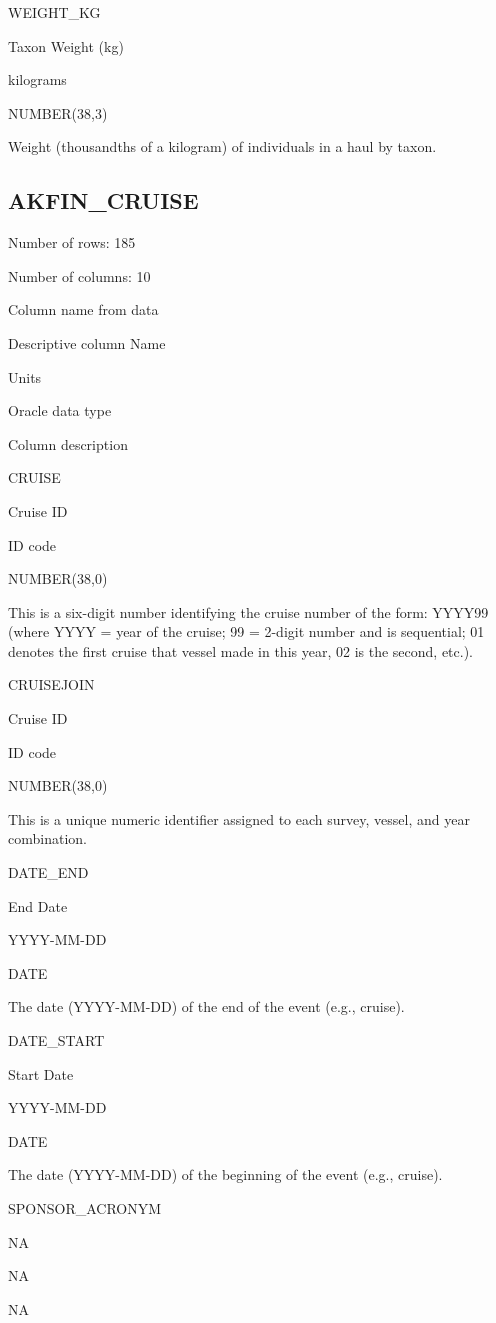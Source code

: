 \documentclass[
  letterpaper,
  oneside,
  open=any]{scrbook}
\begin{document}
WEIGHT\_KG

Taxon Weight (kg)

kilograms

NUMBER(38,3)

Weight (thousandths of a kilogram) of individuals in a haul by taxon.

\hypertarget{akfin_cruise}{%
\subsection{AKFIN\_CRUISE}\label{akfin_cruise}}

Number of rows: 185

Number of columns: 10

Column name from data

Descriptive column Name

Units

Oracle data type

Column description

CRUISE

Cruise ID

ID code

NUMBER(38,0)

This is a six-digit number identifying the cruise number of the form:
YYYY99 (where YYYY = year of the cruise; 99 = 2-digit number and is
sequential; 01 denotes the first cruise that vessel made in this year,
02 is the second, etc.).

CRUISEJOIN

Cruise ID

ID code

NUMBER(38,0)

This is a unique numeric identifier assigned to each survey, vessel, and
year combination.

DATE\_END

End Date

YYYY-MM-DD

DATE

The date (YYYY-MM-DD) of the end of the event (e.g., cruise).

DATE\_START

Start Date

YYYY-MM-DD

DATE

The date (YYYY-MM-DD) of the beginning of the event (e.g., cruise).

SPONSOR\_ACRONYM

NA

NA

NA
\end{document}
